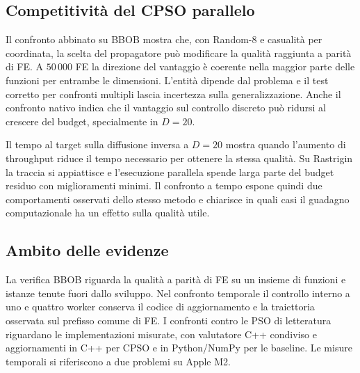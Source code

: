 \subsection{Competitività del CPSO parallelo}
Il confronto abbinato su BBOB mostra che, con Random-8 e casualità per coordinata, la scelta del propagatore può modificare la qualità raggiunta a parità di FE. A $50\,000$ FE la direzione del vantaggio è coerente nella maggior parte delle funzioni per entrambe le dimensioni. L'entità dipende dal problema e il test corretto per confronti multipli lascia incertezza sulla generalizzazione. Anche il confronto nativo indica che il vantaggio sul controllo discreto può ridursi al crescere del budget, specialmente in $D=20$.

Il tempo al target sulla diffusione inversa a $D=20$ mostra quando l'aumento di throughput riduce il tempo necessario per ottenere la stessa qualità. Su Rastrigin la traccia si appiattisce e l'esecuzione parallela spende larga parte del budget residuo con miglioramenti minimi. Il confronto a tempo espone quindi due comportamenti osservati dello stesso metodo e chiarisce in quali casi il guadagno computazionale ha un effetto sulla qualità utile.

\subsection{Ambito delle evidenze}
La verifica BBOB riguarda la qualità a parità di FE su un insieme di funzioni e istanze tenute fuori dallo sviluppo. Nel confronto temporale il controllo interno a uno e quattro worker conserva il codice di aggiornamento e la traiettoria osservata sul prefisso comune di FE. I confronti contro le PSO di letteratura riguardano le implementazioni misurate, con valutatore C++ condiviso e aggiornamenti in C++ per CPSO e in Python/NumPy per le baseline. Le misure temporali si riferiscono a due problemi su Apple M2.
